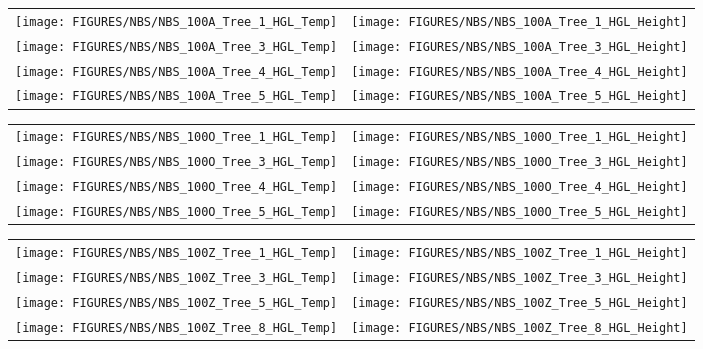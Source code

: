 \newpage

\begin{figure}[p]
\begin{tabular*}{\textwidth}{l@{\extracolsep{\fill}}r}
\texttt{[image: FIGURES/NBS/NBS\_100A\_Tree\_1\_HGL\_Temp]} &
\texttt{[image: FIGURES/NBS/NBS\_100A\_Tree\_1\_HGL\_Height]} \\
\texttt{[image: FIGURES/NBS/NBS\_100A\_Tree\_3\_HGL\_Temp]} &
\texttt{[image: FIGURES/NBS/NBS\_100A\_Tree\_3\_HGL\_Height]} \\
\texttt{[image: FIGURES/NBS/NBS\_100A\_Tree\_4\_HGL\_Temp]} &
\texttt{[image: FIGURES/NBS/NBS\_100A\_Tree\_4\_HGL\_Height]} \\
\texttt{[image: FIGURES/NBS/NBS\_100A\_Tree\_5\_HGL\_Temp]} &
\texttt{[image: FIGURES/NBS/NBS\_100A\_Tree\_5\_HGL\_Height]}
\end{tabular*}
\end{figure}

\begin{figure}[p]
\begin{tabular*}{\textwidth}{l@{\extracolsep{\fill}}r}
\texttt{[image: FIGURES/NBS/NBS\_100O\_Tree\_1\_HGL\_Temp]} &
\texttt{[image: FIGURES/NBS/NBS\_100O\_Tree\_1\_HGL\_Height]} \\
\texttt{[image: FIGURES/NBS/NBS\_100O\_Tree\_3\_HGL\_Temp]} &
\texttt{[image: FIGURES/NBS/NBS\_100O\_Tree\_3\_HGL\_Height]} \\
\texttt{[image: FIGURES/NBS/NBS\_100O\_Tree\_4\_HGL\_Temp]} &
\texttt{[image: FIGURES/NBS/NBS\_100O\_Tree\_4\_HGL\_Height]} \\
\texttt{[image: FIGURES/NBS/NBS\_100O\_Tree\_5\_HGL\_Temp]} &
\texttt{[image: FIGURES/NBS/NBS\_100O\_Tree\_5\_HGL\_Height]}
\end{tabular*}
\end{figure}

\begin{figure}[p]
\begin{tabular*}{\textwidth}{l@{\extracolsep{\fill}}r}
\texttt{[image: FIGURES/NBS/NBS\_100Z\_Tree\_1\_HGL\_Temp]} &
\texttt{[image: FIGURES/NBS/NBS\_100Z\_Tree\_1\_HGL\_Height]} \\
\texttt{[image: FIGURES/NBS/NBS\_100Z\_Tree\_3\_HGL\_Temp]} &
\texttt{[image: FIGURES/NBS/NBS\_100Z\_Tree\_3\_HGL\_Height]} \\
\texttt{[image: FIGURES/NBS/NBS\_100Z\_Tree\_5\_HGL\_Temp]} &
\texttt{[image: FIGURES/NBS/NBS\_100Z\_Tree\_5\_HGL\_Height]} \\
\texttt{[image: FIGURES/NBS/NBS\_100Z\_Tree\_8\_HGL\_Temp]} &
\texttt{[image: FIGURES/NBS/NBS\_100Z\_Tree\_8\_HGL\_Height]}
\end{tabular*}
\end{figure}

